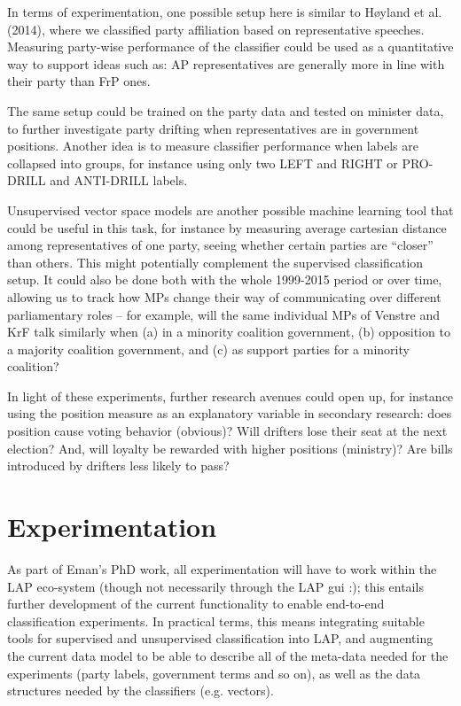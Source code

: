 \documentclass[12pt,a4paper]{article}
\begin{document}
In terms of experimentation, one possible setup here is similar to H{\o}yland et al. (2014), where we classified party affiliation based on representative speeches. Measuring party-wise performance of the classifier could be used as  a quantitative way to support ideas such as: AP representatives are generally more in line with their party than FrP ones.

The same setup could be trained on the party data and tested on minister data, to further investigate party drifting when representatives are in government positions. Another idea is to measure classifier performance when labels are collapsed into groups, for instance using only two LEFT and RIGHT or PRO-DRILL and ANTI-DRILL labels. 

Unsupervised vector space models are another possible machine learning tool that could be useful in this task, for instance by measuring average cartesian distance among representatives of one party, seeing whether certain parties are ``closer'' than others. This might potentially complement the supervised classification setup. It could also be done both with the whole 1999-2015 period or over time, allowing us to track how MPs change their way of communicating over different parliamentary roles -- for example, will the same individual MPs of Venstre and KrF talk similarly when (a) in a minority coalition government, (b) opposition to a majority coalition government, and (c) as support parties for a minority coalition?

In light of these experiments, further research avenues could open up, for instance using the position measure as an explanatory variable in secondary research: does position cause voting behavior (obvious)?  Will drifters lose their seat at the next election? And, will loyalty be rewarded with higher positions (ministry)? Are bills introduced by drifters less likely to pass?

\section{Experimentation}
As part of Eman's PhD work, all experimentation will have to work within the LAP eco-system (though not necessarily through the LAP gui :); this entails further development of the current functionality to enable end-to-end classification experiments. In practical terms, this means integrating suitable tools for supervised and unsupervised classification into LAP, and augmenting the current data model to be able to describe all of the meta-data needed for the experiments (party labels, government terms and so on), as well as the data structures needed by the classifiers (e.g. vectors).
\end{document}
